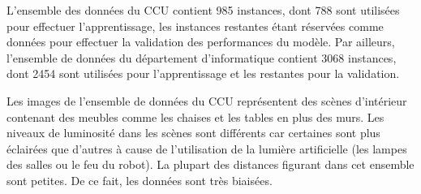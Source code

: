 L'ensemble des données du CCU contient 985 instances, dont 788 sont
utilisées pour effectuer l'apprentissage, les instances restantes étant réservées
comme données pour effectuer la validation des performances du modèle.
Par ailleurs, l'ensemble de données du département d'informatique contient 3068
instances, dont 2454 sont utilisées pour l'apprentissage et les restantes pour
la validation.

Les images de l'ensemble de données du CCU représentent des scènes d'intérieur
contenant des meubles comme les chaises et les tables en plus des murs.
Les niveaux de luminosité dans les scènes sont différents car certaines sont plus
éclairées que d'autres à cause de l'utilisation de la lumière artificielle (les
lampes des salles ou le feu du robot). La plupart des distances figurant dans
cet ensemble sont petites. De ce fait, les données sont très biaisées.

\bigskip

